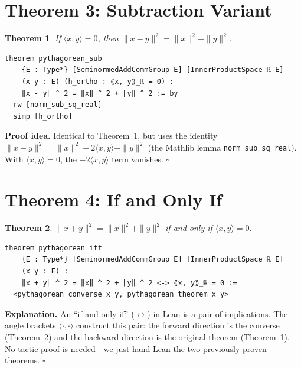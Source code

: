 \documentclass[11pt]{article}
\theoremstyle{plain}
\newtheorem{theorem}{Theorem}[section]
\theoremstyle{definition}
\begin{document}
\section{Theorem 3: Subtraction Variant}

\begin{theorem}
If $\langle x,y\rangle = 0$, then $\|x - y\|^2 = \|x\|^2 + \|y\|^2$.
\end{theorem}

\begin{lstlisting}
theorem pythagorean_sub
    {E : Type*} [SeminormedAddCommGroup E] [InnerProductSpace ℝ E]
    (x y : E) (h_ortho : ⟪x, y⟫_ℝ = 0) :
    ‖x - y‖ ^ 2 = ‖x‖ ^ 2 + ‖y‖ ^ 2 := by
  rw [norm_sub_sq_real]
  simp [h_ortho]
\end{lstlisting}

\textbf{Proof idea.} Identical to Theorem~1, but uses the identity
$\|x - y\|^2 = \|x\|^2 - 2\langle x,y\rangle + \|y\|^2$
(the Mathlib lemma \texttt{norm\_sub\_sq\_real}). With $\langle x,y\rangle = 0$,
the $-2\langle x,y\rangle$ term vanishes. $\square$

\section{Theorem 4: If and Only If}

\begin{theorem}
$\|x+y\|^2 = \|x\|^2 + \|y\|^2$ if and only if $\langle x,y\rangle = 0$.
\end{theorem}

\begin{lstlisting}
theorem pythagorean_iff
    {E : Type*} [SeminormedAddCommGroup E] [InnerProductSpace ℝ E]
    (x y : E) :
    ‖x + y‖ ^ 2 = ‖x‖ ^ 2 + ‖y‖ ^ 2 <-> ⟪x, y⟫_ℝ = 0 :=
  <pythagorean_converse x y, pythagorean_theorem x y>
\end{lstlisting}

\textbf{Explanation.} An ``if and only if'' ($\leftrightarrow$) in Lean is a pair
of implications. The angle brackets $\langle\cdot,\cdot\rangle$ construct this
pair: the forward direction is the converse (Theorem~2) and the backward
direction is the original theorem (Theorem~1). No tactic proof is needed---we
just hand Lean the two previously proven theorems. $\square$
\end{document}
